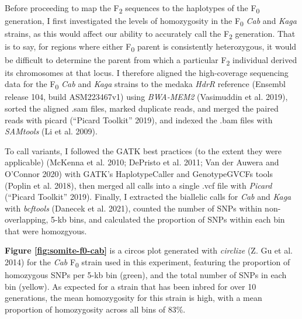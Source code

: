 \documentclass[
]{book}
\begin{document}
Before proceeding to map the F\textsubscript{2} sequences to the haplotypes of the F\textsubscript{0} generation, I first investigated the levels of homozygosity in the F\textsubscript{0} \emph{Cab} and \emph{Kaga} strains, as this would affect our ability to accurately call the F\textsubscript{2} generation. That is to say, for regions where either F\textsubscript{0} parent is consistently heterozygous, it would be difficult to determine the parent from which a particular F\textsubscript{2} individual derived its chromosomes at that locus. I therefore aligned the high-coverage sequencing data for the F\textsubscript{0} \emph{Cab} and \emph{Kaga} strains to the medaka \emph{HdrR} reference (Ensembl release 104, build ASM223467v1) using \emph{BWA-MEM2} (Vasimuddin et al. 2019), sorted the aligned .sam files, marked duplicate reads, and merged the paired reads with picard ({``Picard Toolkit''} 2019), and indexed the .bam files with \emph{SAMtools} (Li et al. 2009).

To call variants, I followed the GATK best practices (to the extent they were applicable) (McKenna et al. 2010; DePristo et al. 2011; Van der Auwera and O'Connor 2020) with GATK's HaplotypeCaller and GenotypeGVCFs tools (Poplin et al. 2018), then merged all calls into a single .vcf file with \emph{Picard} ({``Picard Toolkit''} 2019). Finally, I extracted the biallelic calls for \emph{Cab} and \emph{Kaga} with \emph{bcftools} (Danecek et al. 2021), counted the number of SNPs within non-overlapping, 5-kb bins, and calculated the proportion of SNPs within each bin that were homozgyous.

\textbf{Figure \ref{fig:somite-f0-cab}} is a circos plot generated with \emph{circlize} (Z. Gu et al. 2014) for the \emph{Cab} F\textsubscript{0} strain used in this experiment, featuring the proportion of homozygous SNPs per 5-kb bin (green), and the total number of SNPs in each bin (yellow). As expected for a strain that has been inbred for over 10 generations, the mean homozygosity for this strain is high, with a mean proportion of homozygosity across all bins of 83\%.
\end{document}
